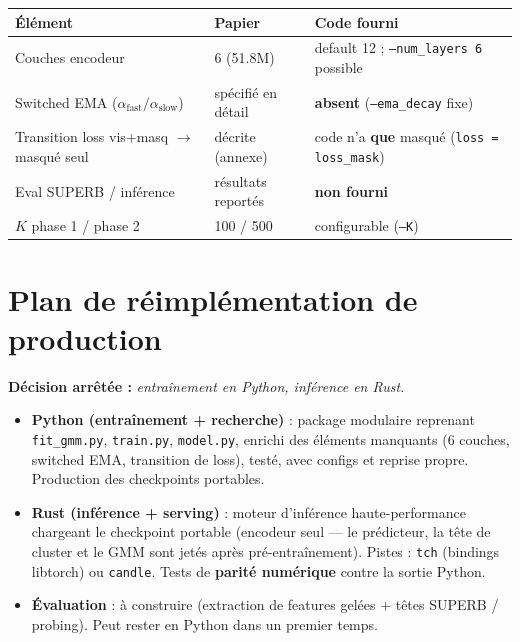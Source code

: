 \documentclass[11pt,a4paper]{article}
\newcommand{\code}[1]{\texttt{#1}}
\newcommand{\file}[1]{\texttt{#1}}
\begin{document}
\begin{center}
\begin{tabular}{@{}p{}p{}p{}@{}}
\toprule
\textbf{Élément} & \textbf{Papier} & \textbf{Code fourni} \\
\midrule
Couches encodeur & 6 (51.8M) & default 12 ; \code{--num\_layers 6} possible \\
Switched EMA ($\alpha_\text{fast}/\alpha_\text{slow}$)
  & spécifié en détail & \textbf{absent} (\code{--ema\_decay} fixe) \\
Transition loss vis+masq $\to$ masqué seul
  & décrite (annexe) & code n'a \textbf{que} masqué (\code{loss = loss\_mask}) \\
Eval SUPERB / inférence & résultats reportés & \textbf{non fourni} \\
$K$ phase 1 / phase 2 & 100 / 500 & configurable (\code{--K}) \\
\bottomrule
\end{tabular}
\end{center}

\section{Plan de réimplémentation de production}
\label{sec:prod}

\textbf{Décision arrêtée :} \emph{entraînement en Python, inférence en
Rust}.

\begin{itemize}[leftmargin=*]
  \item \textbf{Python (entraînement + recherche)} : package modulaire
  reprenant \file{fit\_gmm.py}, \file{train.py}, \file{model.py},
  enrichi des éléments manquants (6 couches, switched EMA, transition de
  loss), testé, avec configs et reprise propre. Production des checkpoints
  portables.
  \item \textbf{Rust (inférence + serving)} : moteur d'inférence
  haute-performance chargeant le checkpoint portable (encodeur seul --- le
  prédicteur, la tête de cluster et le GMM sont jetés après
  pré-entraînement). Pistes : \code{tch} (bindings libtorch) ou
  \code{candle}. Tests de \textbf{parité numérique} contre la sortie
  Python.
  \item \textbf{Évaluation} : à construire (extraction de features gelées +
  têtes SUPERB / probing). Peut rester en Python dans un premier temps.
\end{itemize}
\end{document}
